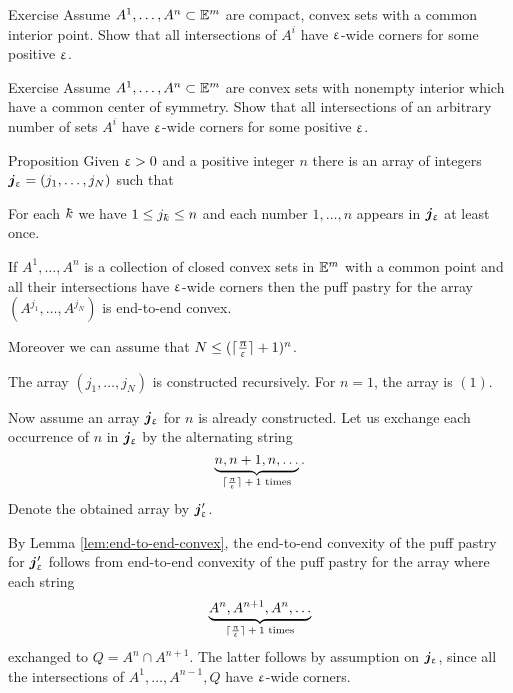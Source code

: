 \begin{thm}{Exercise}\label{ex:compact-walls}
Assume $A^1,\dots,A^n\subset\EE^m$ are compact, convex sets with a common interior point.
Show that all intersections of $A^i$ have $\upvarepsilon$-wide corners for some positive $\upvarepsilon$.
\end{thm}

\begin{thm}{Exercise}\label{ex:centrally-simmetric-walls}
Assume $A^1,\dots,A^n\subset\EE^m$ are
convex sets with nonempty interior which have a common center of symmetry.
Show that all intersections of an arbitrary number of sets $A^i$ have $\upvarepsilon$-wide corners for some positive $\upvarepsilon$.
\end{thm}

\begin{thm}{Proposition}\label{prop:end-to-end-convex}
Given $\upvarepsilon>0$ and a positive integer $n$
there is an array of integers $\bm{j}_\eps=(j_1,\dots,j_N)$ 
such that 

\begin{subthm}{} For each $\kay$ we have $1\le j_\kay\le n$
and each number $1,\dots,n$ appears in $\bm{j}_\upvarepsilon$ at least once.
\end{subthm}

\begin{subthm}{}
If $A^1,\dots,A^n$ is a collection of closed convex sets in $\mathbb{E}^m$ with a common point 
and all their intersections have $\upvarepsilon$-wide corners 
then the puff pastry for the array
$(A^{j_1},\dots,A^{j_N})$ is end-to-end convex.
\end{subthm}

Moreover we can assume that $N\le (\lceil\tfrac\pi\eps\rceil+1)^n$.
\end{thm}

The array $(j_1,\dots,j_N)$ is constructed recursively.
For $n=1$, the array  is $(1)$.

Now assume an array $\bm{j}_\upvarepsilon$ for $n$ is already constructed.
Let us exchange each occurrence of $n$ in $\bm{j}_\upvarepsilon$ by the alternating string 
\[\underbrace{n,n+1,n,\dots}_{\text{$\lceil\tfrac\pi\eps\rceil+1$ times}}.\]
Denote the obtained array by $\bm{j}_\upvarepsilon'$.

By Lemma \ref{lem:end-to-end-convex},
the end-to-end convexity of the puff pastry for $\bm{j}_\upvarepsilon'$
follows from end-to-end convexity of the puff pastry for the array
where each string
\[\underbrace{A^n,A^{n+1},A^n,\dots}_{\text{$\lceil\tfrac\pi\eps\rceil+1$ times}}\]
exchanged to $Q=A^n\cap A^{n+1}$.
The latter follows by assumption on $\bm{j}_\upvarepsilon$, 
since all the intersections of $A^1,\dots,A^{n-1},Q$
have $\upvarepsilon$-wide corners.%

